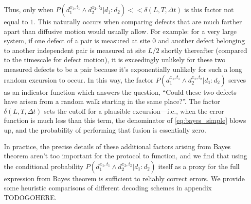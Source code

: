 \documentclass[twocolumn,superscriptaddress,aps,prb,floatfix]{revtex4-1}
\begin{document}
Thus, only when $P(d_1^{x_1,t_1} \wedge d_2^{x_2,t_2} | d_1:d_2) << \delta(L,T,\Delta t)$ is this factor not equal to $1$.  This naturally occurs when comparing defects that are much farther apart than diffusive motion would usually allow.  For example: for a very large system, if one defect of a pair is measured at site $0$ and another defect belonging to another independent pair is measured at site $L/2$ shortly thereafter (compared to the timescale for defect motion), it is exceedingly unlikely for these two measured defects to be a pair because it's exponentially unlikely for such a long random excursion to occur.  In this way, the factor $P(d_1^{x_1,t_1} \wedge d_2^{x_2,t_2} | d_1:d_2)$  serves as an indicator function which answers the question, ``Could these two defects have arisen from a random walk starting in the same place?''.  The factor $\delta(L,T,\Delta t)$ sets the cutoff for a plausible excursion---i.e., when the error function is much less than this term, the denominator of \ref{eq:bayes_simple} blows up, and the probability of performing that fusion is essentially zero.

In practice, the precise details of these additional factors arising from Bayes theorem aren't too important for the protocol to function, and we find that using the conditional probability $P(d_1^{x_1,t_1} \wedge d_2^{x_2,t_2} | d_1:d_2)$ itself as a proxy for the full expression from Bayes theorem is sufficient to reliably correct errors.  We provide some heuristic comparisons of different decoding schemes in appendix TODOGOHERE.




\end{document}

